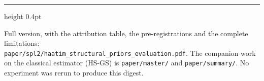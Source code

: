 \documentclass[11pt]{article}
\begin{document}
\vspace{10pt}
\hrule height 0.4pt
\vspace{6pt}

{\small\textcolor{tag}{Full version, with the attribution table, the
pre-registrations and the complete limitations:\\
\texttt{paper/spl2/haatim\_structural\_priors\_evaluation.pdf}. The companion
work on the classical estimator (HS-GS) is \texttt{paper/master/} and
\texttt{paper/summary/}. No experiment was rerun to produce this digest.}\par}
\end{document}
